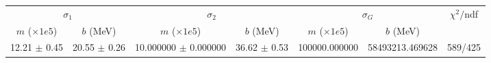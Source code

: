 \begin{tabular}{cc|cc|cc||c}
\multicolumn{2}{c|}{$\sigma_1$} & \multicolumn{2}{|c}{$\sigma_2$} & \multicolumn{2}{|c}{$\sigma_G$}  & \multirow{2}{*}{$\chi^2/$ndf}\\
$m$ ($\times1e5$) & $b$ (MeV) & $m$ ($\times1e5$) & $b$ (MeV) & $m$ ($\times1e5$) & $b$ (MeV) & \\
\hline
12.21 $\pm$ 0.45 & 20.55 $\pm$ 0.26 & 10.000000 $\pm$ 0.000000 & 36.62 $\pm$ 0.53 & 100000.000000 & 58493213.469628 & 589/425\\
\end{tabular}
